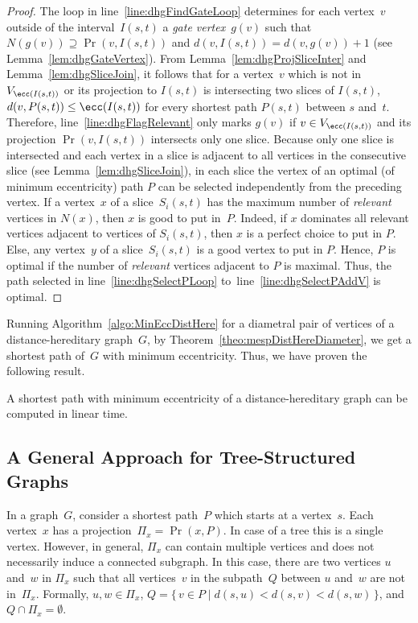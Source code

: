 \begin{proof}
The loop in line~\ref{line:dhgFindGateLoop} determines for each vertex~$v$ outside of the interval~$I(s,t)$ a \emph{gate vertex}~$g(v)$ such that $N(g(v)) \supseteq \Pr(v, I(s,t))$ and $d(v, I(s,t)) = d(v, g(v)) + 1$ (see Lemma~\ref{lem:dhgGateVertex}).
From Lemma~\ref{lem:dhgProjSliceInter} and Lemma~\ref{lem:dhgSliceJoin}, it follows that for a vertex~$v$ which is not in $V_{\ecc(I(s, t))}$ or its projection to $I(s,t)$ is intersecting two slices of $I(s, t)$, $d(v, P(s, t)) \leq \ecc(I(s, t))$ for every shortest path $P(s, t)$ between $s$ and~$t$.
Therefore, line~\ref{line:dhgFlagRelevant} only marks $g(v)$ if $v \in V_{\ecc(I(s, t))}$ and its projection $\Pr(v, I(s,t))$ intersects only one slice.
Because only one slice is intersected and each vertex in a slice is adjacent to all vertices in the consecutive slice (see Lemma~\ref{lem:dhgSliceJoin}), in each slice the vertex of an optimal (of minimum eccentricity) path $P$ can be selected independently from the preceding vertex.
If a vertex~$x$ of a slice~$S_i(s,t)$ has the maximum number of \emph{relevant} vertices in $N(x)$, then $x$ is good to put in~$P$.
Indeed, if $x$ dominates all relevant vertices adjacent to vertices of $S_i(s,t)$, then $x$ is a perfect choice to put in $P$.
Else, any vertex~$y$ of a slice~$S_i(s, t)$ is a good vertex to put in $P$.
Hence, $P$ is optimal if the number of \emph{relevant} vertices adjacent to $P$ is maximal.
Thus, the path selected in line~\ref{line:dhgSelectPLoop} to~line~\ref{line:dhgSelectPAddV} is optimal.
\end{proof}

Running Algorithm~\ref{algo:MinEccDistHere} for a diametral pair of vertices of a distance-hereditary graph~$G$, by Theorem~\ref{theo:mespDistHereDiameter}, we get a shortest path of~$G$ with minimum eccentricity.
Thus, we have proven the following result.

\begin{theorem}
    \label{tm:opt-path}
A shortest path with minimum eccentricity of a distance-hereditary graph can be computed in linear time.
\end{theorem}


\subsection{A General Approach for Tree-Structured Graphs}
    \label{sec:mespProjGapApproach}

In a graph~$G$, consider a shortest path~$P$ which starts at a vertex~$s$.
Each vertex~$x$ has a projection~$\Pi_x = \Pr(x, P)$.
In case of a tree this is a single vertex.
However, in general, $\Pi_x$ can contain multiple vertices and does not necessarily induce a connected subgraph.
In this case, there are two vertices $u$ and~$w$ in $\Pi_x$ such that all vertices~$v$ in the subpath~$Q$ between $u$ and~$w$ are not in~$\Pi_x$.
Formally, $u,w \in \Pi_x$, $Q = \{ \, v \in P \mid d(s,u) < d(s,v) < d(s, w) \, \}$, and $Q \cap \Pi_x = \emptyset$.

